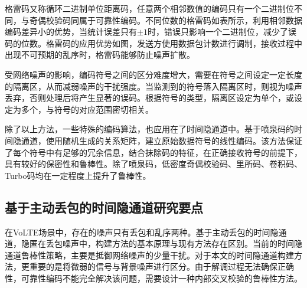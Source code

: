 格雷码又称循环二进制单位距离码，任意两个相邻数值的编码只有一个二进制位不同，与奇偶校验码同属于可靠性编码。不同位数的格雷码如表所示，利用相邻数据编码差异小的优势，当统计误差只有$\pm1$时，错误只影响一个二进制位，减少了误码的位数。格雷码的应用优势如图，发送方使用数据包计数进行调制，接收过程中出现不可预期的乱序时，格雷码能够防止噪声扩散。

受网络噪声的影响，编码符号之间的区分难度增大，需要在符号之间设定一定长度的隔离区，从而减弱噪声的干扰强度。当监测到的符号落入隔离区时，则视为噪声丢弃，否则处理后将产生显著的误码。根据符号的类型，隔离区设定为单个，或设定为多个，与符号的对应范围密切相关。

除了以上方法，一些特殊的编码算法，也应用在了时间隐通道中。基于喷泉码的时间隐通道，使用随机生成的关系矩阵，建立原始数据符号的线性编码。该方法保证了每个符号中有足够的冗余信息，结合抹除码的特征，在正确接收符号的前提下，具有较好的保密性和鲁棒性。除了喷泉码，低密度奇偶校验码、里所码、卷积码、Turbo码均在一定程度上提升了鲁棒性。

\subsection{基于主动丢包的时间隐通道研究要点}
在VoLTE场景中，存在的噪声只有丢包和乱序两种。基于主动丢包的时间隐通道，隐匿在丢包噪声中，构建方法的基本原理与现有方法存在区别。当前的时间隐通道鲁棒性策略，主要是抵御网络噪声的少量干扰。对于本文的时间隐通道构建方法，更重要的是将微弱的信号与背景噪声进行区分。由于解调过程无法确保正确性，可靠性编码不能完全解决该问题，需要设计一种内部交叉校验的鲁棒性方法。